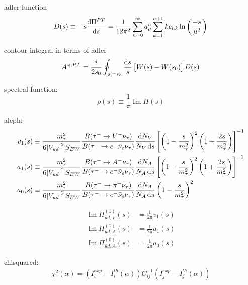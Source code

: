 \documentclass{article}
\begin{document}
  adler function
  \begin{equation}
    D(s) \equiv -s \frac{\dif \Pi^{PT}}{\dif s} = \frac{1}{12\pi^2}\sum_{n=0}^\infty a_\mu^n \sum_{k=1}^{n+1} k c_{nk} \ln\left( \frac{-s}{\mu^2} \right)
  \end{equation}

  contour integral in terms of adler
  \begin{equation}
    A^{\omega,PT} = \frac{i}{2 s_0} \oint_{\envert{s}=s_o} \frac{\dif s}{s} \left[ W(s) - W(s_0) \right] D(s)
  \end{equation}

  spectral function:
  \begin{equation}
    \rho(s) \equiv \frac{1}{\pi} \operatorname{Im}\Pi(s)
  \end{equation}
  
  aleph:
  \begin{equation}
    \begin{split}
      v_1(s) &\equiv \frac{m_\tau^2}{6 \envert{V_{ud}}^2S_{EW}} \frac{B(\tau^- \to V^- \nu_\tau)}{B(\tau^- \to e^- \bar \nu_e \nu_\tau)} \frac{\dif N_V}{N_V \dif s} \left[ \left( 1 - \frac{s}{m_\tau^2} \right)^2 \left( 1 + \frac{2 s}{m_\tau^2}\right) \right]^{-1} \\
      a_1(s) &\equiv \frac{m_\tau^2}{6 \envert{V_{ud}}^2S_{EW}} \frac{B(\tau^- \to A^- \nu_\tau)}{B(\tau^- \to e^- \bar \nu_e \nu_\tau)} \frac{\dif N_A}{N_A \dif s} \left[ \left( 1 - \frac{s}{m_\tau^2} \right)^2 \left( 1 + \frac{2 s}{m_\tau^2}\right) \right]^{-1} \\
      a_0(s) &\equiv \frac{m_\tau^2}{6 \envert{V_{ud}}^2S_{EW}} \frac{B(\tau^- \to \pi^- \nu_\tau)}{B(\tau^- \to e^- \bar \nu_e \nu_\tau)} \frac{\dif N_A}{N_A \dif s} \left( 1 - \frac{s}{m_\tau^2} \right)^2
    \end{split}
  \end{equation} 

  \begin{equation}
    \begin{split}
      \operatorname{Im} \Pi_{\bar u d,V}^{(1)}(s) &= \frac{1}{2\pi} v_1(s) \\
      \operatorname{Im} \Pi_{\bar u d,A}^{(1)}(s) &= \frac{1}{2\pi} a_1(s) \\
      \operatorname{Im} \Pi_{\bar u d,A}^{(0)}(s) &= \frac{1}{2\pi} a_0(s)
    \end{split}
  \end{equation}

  chisquared:
  \begin{equation}
    \chi^2(\alpha) = (I_i^{exp}-I_i^{th}(\alpha)) C_{ij}^{-1} (I_j^{exp}-I_j^{th}(\alpha))
  \end{equation}
\end{document}
